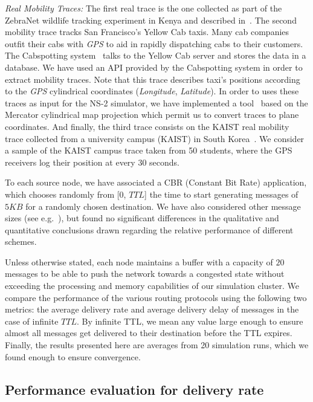 \emph{Real Mobility Traces:} The first real trace is the one collected as part of the ZebraNet wildlife tracking experiment in Kenya and described in~\cite{ZebraNetMovement}. The second mobility trace tracks San Francisco's Yellow Cab taxis. Many cab companies outfit their cabs with \emph{GPS} to aid in rapidly dispatching cabs to their customers. The Cabspotting system~\cite{Cabspotting} talks to the Yellow Cab server and stores the data in a database. We have used an API provided by the Cabspotting system in order to extract mobility traces. Note that this trace describes taxi's positions according to the \emph{GPS} cylindrical coordinates (\emph{Longitude}, \emph{Latitude}). In order to uses these traces as input for the NS-2 simulator, we have implemented a tool~\cite{DTN-NS2} based on the Mercator cylindrical map projection which permit us to convert traces to plane coordinates. And finally, the third trace consists on the KAIST real mobility trace collected from a university campus (KAIST) in South Korea~\cite{KAIST}. We consider a sample of the KAIST campus trace taken from 50 students, where the GPS receivers log their position at every 30 seconds. 

To each source node, we have associated a CBR (Constant Bit Rate) application, which chooses randomly from [0, $TTL$] the time to start generating messages of $5KB$ for a randomly chosen destination. We have also considered other message sizes (see e.g.~\cite{KrifaBS08}), but found no significant differences in the qualitative and quantitative conclusions drawn regarding the relative performance of different schemes.

Unless otherwise stated, each node maintains a buffer with a capacity of $20$ messages to be able to push the network towards a congested state without exceeding the processing and memory capabilities of our simulation cluster. We compare the performance of the various routing protocols using the following two metrics: the average delivery rate and average delivery delay of messages in the case of infinite $TTL$. By infinite TTL, we mean any value large enough to ensure almost all messages get delivered to their destination before the TTL expires. Finally, the results presented here are averages from 20 simulation runs, which we found enough to ensure convergence.

\subsection{Performance evaluation for delivery rate}
\label{sec:sims:DR}

